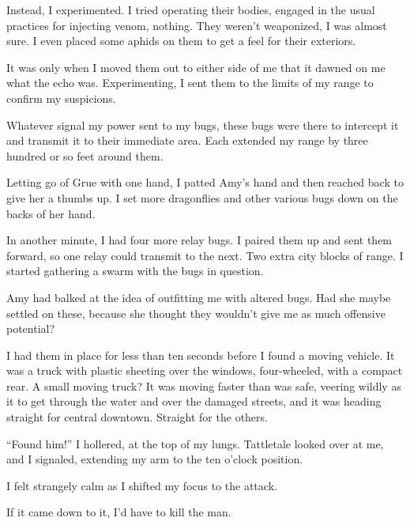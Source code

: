Instead, I experimented.  I tried operating their bodies, engaged in the usual practices for injecting venom, nothing.  They weren't weaponized, I was almost sure.  I even placed some aphids on them to get a feel for their exteriors.



It was only when I moved them out to either side of me that it dawned on me what the echo was.  Experimenting, I sent them to the limits of my range to confirm my suspicions.



Whatever signal my power sent to my bugs, these bugs were there to intercept it and transmit it to their immediate area.  Each extended my range by three hundred or so feet around them.



Letting go of Grue with one hand, I patted Amy's hand and then reached back to give her a thumbs up.  I set more dragonflies and other various bugs down on the backs of her hand.



In another minute, I had four more relay bugs.  I paired them up and sent them forward, so one relay could transmit to the next.  Two extra city blocks of range.  I started gathering a swarm with the bugs in question.



Amy had balked at the idea of outfitting me with altered bugs.  Had she maybe settled on these, because she thought they wouldn't give me as much offensive potential?



I had them in place for less than ten seconds before I found a moving vehicle.  It was a truck with plastic sheeting over the windows, four-wheeled, with a compact rear.  A small moving truck?  It was moving faster than was safe, veering wildly as it to get through the water and over the damaged streets, and it was heading straight for central downtown.  Straight for the others.



``Found him!''  I hollered, at the top of my lungs.  Tattletale looked over at me, and I signaled, extending my arm to the ten o'clock position.



I felt strangely calm as I shifted my focus to the attack.



If it came down to it, I'd have to kill the man.



